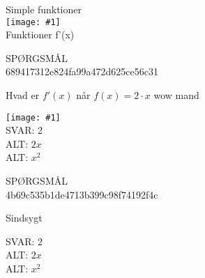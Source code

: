 \documentclass[]{article}
\newenvironment{question}[2]{SPØRGSMÅL\\}{\hspace{50px}}
\newcommand{\name}[1]{{\huge #1}\\}
\newcommand{\tag}[1]{#1}
\newcommand{\cover}[1]{\texttt{[image: \#1]}\\}
\newcommand{\image}[1]{\texttt{[image: \#1]}\\}
\newcommand{\answer}[1]{{\color{green} SVAR: #1}\\}
\newcommand{\alt}[1]{{\color{red} ALT: #1}\\}
\begin{document}
\name{Simple funktioner}
\cover{test.png}
\tag{Funktioner}
\tag{f'(x)}

\begin{question}{multi}\id{689417312e824fa99a472d625ce56c31}
    
Hvad er $f'(x)$ når $f(x)=2\cdot x$ wow mand

\image{test.png}

\answer{2}
\alt{$2x$}
\alt{$x^2$}

\end{question}

\begin{question}{multi}\id{4b69c535b1de4713b399c98f74192f4c}
    
Sindsygt

\answer{2}
\alt{$2x$}
\alt{$x^2$}

\end{question}
\end{document}
